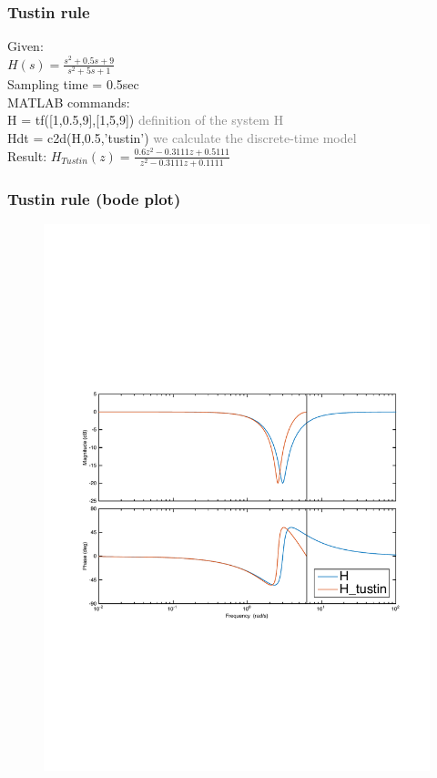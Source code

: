 \begin{frame}
	\frametitle{Tustin rule}
	\begin{example}
		Given:\\
		$H(s) = \frac{s^{2} + 0.5s + 9}{s^{2} + 5s + 1}$\\
		Sampling time = 0.5sec\\
		\vspace{1em}
		MATLAB commands:\\
		
		H = tf([1,0.5,9],[1,5,9])	\textcolor{gray}{definition of the system H} \\
		Hdt = c2d(H,0.5,'tustin')	\textcolor{gray}{we calculate the discrete-time model}\\
		\vspace{1em}
		Result: 
		$H_{Tustin}(z) = \frac{0.6z^{2} - 0.3111z + 0.5111}{z^{2} -  0.3111z + 0.1111}$
	\end{example}
\end{frame}

\begin{frame}
	\frametitle{Tustin rule (bode plot)}
	\vspace{-0.7em}
	\begin{figure}
		\centering
		\includegraphics[width=0.9\linewidth]{distortion_bode2}
	\end{figure}
\end{frame}


